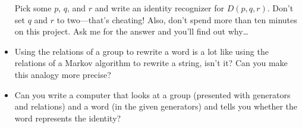 \documentclass{article}
\newcommand*\proveit{\item[\manimpossiblecube]}
\newcommand*{\thinkit}{\item[\Coffeecup]}
\begin{document}
\begin{itemize}
Pick some $p$, $q$, and $r$ and write an identity recognizer for $D(p, q, r)$. Don't set $q$ and $r$ to two---that's cheating! Also, don't spend more than ten minutes on this project. Ask me for the answer and you'll find out why\ldots
\thinkit Using the relations of a group to rewrite a word is a lot like using the relations of a Markov algorithm to rewrite a string, isn't it? Can you make this analogy more precise?
\proveit Can you write a computer that looks at a group (presented with generators and relations) and a word (in the given generators) and tells you whether the word represents the identity?
\end{itemize}
\end{document}
